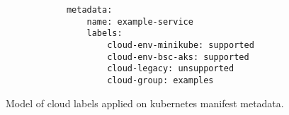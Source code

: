 \documentclass[../main.tex]{subfiles}
\begin{document}
    \begin{figure}[h]
        \begin{verbatim}
            metadata:
                name: example-service
                labels:
                    cloud-env-minikube: supported
                    cloud-env-bsc-aks: supported
                    cloud-legacy: unsupported
                    cloud-group: examples
        \end{verbatim}
        \captionsetup{justification=centering}
        \caption{
            Model of \gls{cloud} labels applied on \gls{kubernetes} manifest metadata.
        }
        \label{lst:meta_labels}
    \end{figure}
\end{document}
